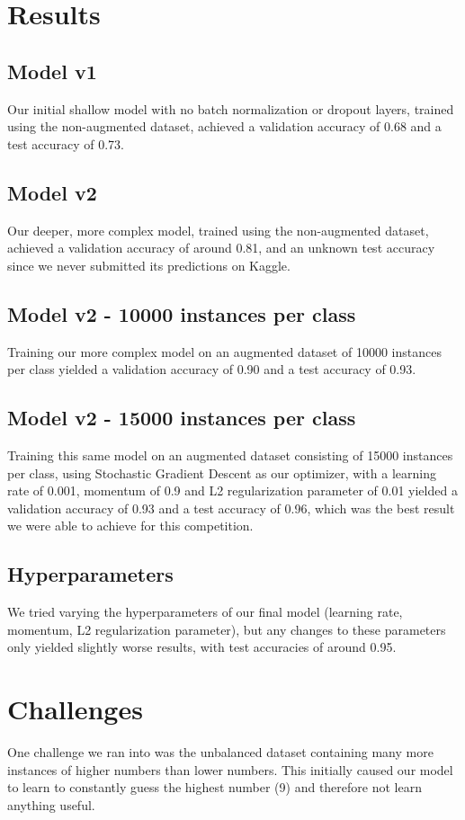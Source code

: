 \documentclass[11pt]{article}
\begin{document}
\section{Results}

\subsection{Model v1}
Our initial shallow model with no batch normalization or dropout layers,
trained using the non-augmented dataset, achieved a validation accuracy
of 0.68 and a test accuracy of 0.73.

\subsection{Model v2}
Our deeper, more complex model, trained using the non-augmented dataset,
achieved a validation accuracy of around 0.81, and an unknown test
accuracy since we never submitted its predictions on Kaggle.

\subsection{Model v2 - 10000 instances per class}
Training our more complex model on an augmented dataset of 10000
instances per class yielded a validation accuracy of 0.90 and a test
accuracy of 0.93.

\subsection{Model v2 - 15000 instances per class}
Training this same model on an augmented dataset consisting of 15000
instances per class, using Stochastic Gradient Descent as our optimizer,
with a learning rate of 0.001, momentum of 0.9 and L2 regularization
parameter of 0.01 yielded a validation accuracy of 0.93 and a test
accuracy of 0.96, which was the best result we were able to achieve for
this competition.

\subsection{Hyperparameters}
We tried varying the hyperparameters of our final model (learning rate,
momentum, L2 regularization parameter), but any changes to these
parameters only yielded slightly worse results, with test accuracies of
around 0.95.

\section{Challenges}
One challenge we ran into was the unbalanced dataset containing many
more instances of higher numbers than lower numbers. This initially
caused our model to learn to constantly guess the highest number (9) and
therefore not learn anything useful. 
\end{document}
